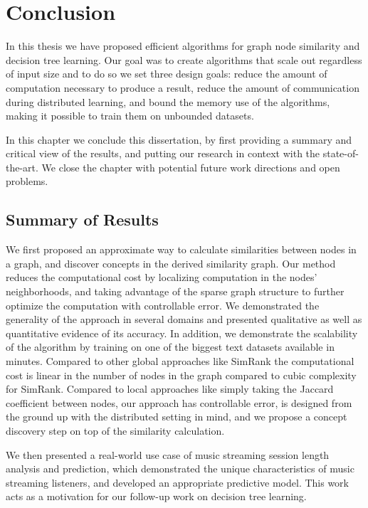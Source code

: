 \chapter{Conclusion}

In this thesis we have proposed efficient algorithms for graph node
similarity and decision tree learning. Our goal was to create
algorithms that scale out regardless of input size and to do so
we set three design goals: reduce the amount of computation
necessary to produce a result, reduce the amount of communication
during distributed learning, and bound the memory use of the algorithms,
making it possible to train them on unbounded datasets.

In this chapter we conclude this dissertation, by first providing a
summary and critical view of the results, and putting our research
in context with the state-of-the-art.
We close the chapter with potential future work directions and open
problems.

\section{Summary of Results}
We first proposed an approximate way to calculate similarities between
nodes in a graph, and discover concepts in the derived similarity
graph. Our method reduces the computational cost
by localizing computation in the nodes' neighborhoods, and taking advantage
of the sparse graph structure to further optimize the computation with controllable
error. We demonstrated the generality of the approach in several domains and presented
qualitative as well as quantitative evidence of its accuracy. In addition, we demonstrate
the scalability of the algorithm by training on one of the biggest text datasets
available in minutes. Compared to other global approaches like SimRank \cite{simrank}
the computational cost is linear in the number of nodes in the graph compared to cubic
complexity for SimRank.
Compared to local approaches like simply taking the Jaccard coefficient between nodes, our
approach has controllable error, is designed from the ground up with the distributed
setting in mind, and we propose a concept discovery step on top of the similarity
calculation.

We then presented a real-world use case of music streaming session length analysis and prediction,
which demonstrated the unique characteristics of music streaming listeners, and developed
an appropriate predictive model. This work acts as a motivation for our follow-up work
on decision tree learning.


